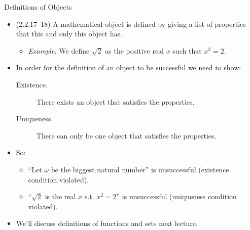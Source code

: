 \begin{frame}{Definitions of Objects}

	\begin{itemize}
	
		\item (2.2.17--18) A mathematical object is defined by giving a list of properties that this and only this object has.
		
		\begin{itemize}

		\item \emph{Example.} We define $\sqrt{2}$ as the positive real $x$ such that $x^2=2$.
		
		\end{itemize}
		
		\item In order for the definition of an object to be successful we need to show:
		
		\begin{description}
		
			\item[Existence.] There exists an object that satisfies the properties.
						
			\item[Uniqueness.] There can only be one object that satisfies the properties.
		
		\end{description}
		
		\item So:
		
			\begin{itemize}
			
				\item ``Let $\omega$ be the biggest natural number'' is unsuccessful (existence condition violated).
				
				\item ``$\sqrt{2}$ is the real $x$ s.t. $x^2=2$'' is unsuccessful (uniqueness condition violated).
			
			\end{itemize}
			
		\item We'll discuss definitions of functions and sets next lecture.
	
	\end{itemize}

\end{frame}

